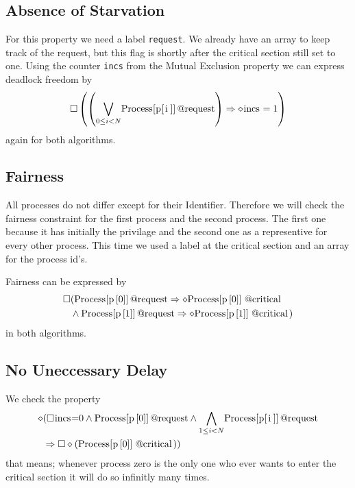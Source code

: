 \documentclass{llncs}
\begin{document}
\subsection{Absence of Starvation}

For this property we need a label \lstinline|request|. We already have an array to keep track of the request,
but this flag is shortly after the critical section still set to one.
Using the counter \lstinline|incs| from the Mutual Exclusion property we can express deadlock freedom by
\begin{equation}
    \square \left( \left( \underset{0\leq i < N}{\bigvee} \text{\lstinline|Process[p[i]]@request|}\right) \Rightarrow \diamond \text{\lstinline|incs|} = 1 \right)
\end{equation}
again for both algorithms.
\subsection{Fairness}

All processes do not differ except for their Identifier. Therefore we will check the fairness constraint for the first process and the second process.
The first one because it has initially the privilage and the second one as a representive for every other process.
This time we used a label at the critical section and an array for the process id's.

Fairness can be expressed by
\begin{eqnarray}
    \square & ( \text{\lstinline|Process[p[0]]@request|} \Rightarrow \diamond \text{\lstinline|Process[p[0]]@critical|} \\
    &\land \text{\lstinline|Process[p[1]]@request|}\Rightarrow \diamond \text{\lstinline|Process[p[1]]@critical|})
\end{eqnarray}
in both algorithms.

\subsection{No Uneccessary Delay}

We check the property
\begin{eqnarray}
    \diamond & ( \square \text{\lstinline|incs|=0} \land \text{\lstinline|Process[p[0]]@request|} \land \underset{1\leq i < N}{\bigwedge} \text{\lstinline|Process[p[i]]@request|}\\
    &\Rightarrow \square \diamond(\text{\lstinline|Process[p[0]]@critical|}))
\end{eqnarray}
that means; whenever process zero is the only one who ever wants to enter the critical section it will do so infinitly many times.
\end{document}
